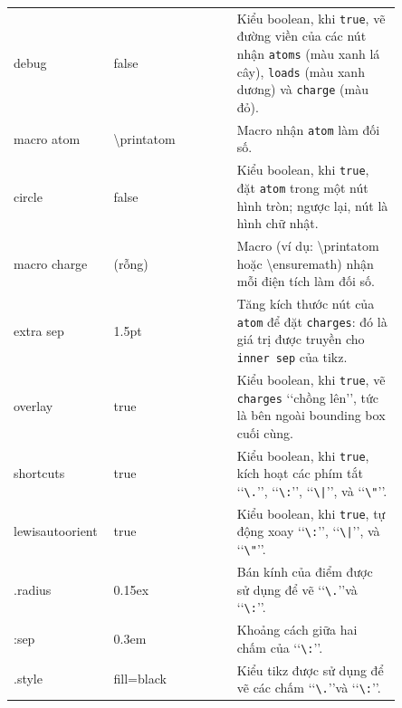 \documentclass[Main_ver2.tex]{subfiles}
\begin{document}
	\begin{table}[!htp]
		\centering
		\caption{Các tham số (khóa/giá trị) có sẵn trong \texttt{general parameters}.}
		\begin{longtable}{|R{0.15\linewidth}|m{0.3\linewidth}|m{0.4\linewidth}|}
			\hline
			 &  &  \\ \hline
			debug & false & Kiểu boolean, khi \texttt{true}, vẽ đường viền của các nút nhận \texttt{atoms} (màu xanh lá cây), \texttt{loads} (màu xanh dương) và \texttt{charge} (màu đỏ). \\ \hline
			macro atom & \textbackslash printatom & Macro nhận \texttt{atom} làm đối số. \\ \hline
			circle & false & Kiểu boolean, khi \texttt{true}, đặt \texttt{atom} trong một nút hình tròn; ngược lại, nút là hình chữ nhật. \\ \hline
			macro charge & (rỗng) & Macro (ví dụ: \textbackslash printatom hoặc \textbackslash ensuremath) nhận mỗi điện tích làm đối số. \\ \hline
			extra sep & 1.5pt & Tăng kích thước nút của \texttt{atom} để đặt \texttt{charges}: đó là giá trị được truyền cho \texttt{inner sep} của tikz. \\ \hline
			overlay & true & Kiểu boolean, khi \texttt{true}, vẽ \texttt{charges} \lq\lq chồng lên\rq\rq, tức là bên ngoài bounding box cuối cùng. \\ \hline
			shortcuts & true & Kiểu boolean, khi \texttt{true}, kích hoạt các phím tắt \lq\lq\texttt{\textbackslash .}\rq\rq, \lq\lq\texttt{\textbackslash :}\rq\rq, \lq\lq\texttt{\textbackslash |}\rq\rq, và \lq\lq\texttt{\textbackslash "}\rq\rq. \\ \hline 
			lewisautoorient & true & Kiểu boolean, khi \texttt{true}, tự động xoay \lq\lq\texttt{\textbackslash :}\rq\rq, \lq\lq\texttt{\textbackslash |}\rq\rq, và \lq\lq\texttt{\textbackslash "}\rq\rq. \\ \hline
			.radius & 0.15ex & Bán kính của điểm được sử dụng để vẽ \lq\lq\texttt{\textbackslash .}\rq\rq và \lq\lq\texttt{\textbackslash :}\rq\rq. \\ \hline
			:sep & 0.3em & Khoảng cách giữa hai chấm của \lq\lq\texttt{\textbackslash :}\rq\rq. \\ \hline
			.style & fill=black & Kiểu tikz được sử dụng để vẽ các chấm \lq\lq\texttt{\textbackslash .}\rq\rq và \lq\lq\texttt{\textbackslash :}\rq\rq. \\ \hline

\end{longtable}
\end{table}
\end{document}
